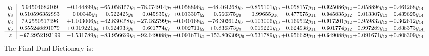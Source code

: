 \documentclass[11pt]{article}
\begin{document}
\[\begin{array}{c| c c@{\hskip 2pt} c@{\hskip 2pt} c@{\hskip 2pt} c@{\hskip 2pt} c@{\hskip 2pt} c@{\hskip 2pt} c@{\hskip 2pt} c@{\hskip 2pt} c@{\hskip 2pt} c@{\hskip 2pt} }
 y_{1}   &  5.94504682109 & -0.144899 y_{4} & + 65.058157 y_{6} & -78.074914 y_{7} & + 0.058896 y_{2} & + 48.464268 y_{9} & -0.855101 y_{10} & -0.058157 y_{11} & -0.925086 y_{12} & -0.058896 y_{13} & -0.464268 y_{14}\\
 y_{8}   &  0.510596352883 & -0.00345 y_{4} & -0.522425 y_{6} & + 0.045835 y_{7} & + 0.013307 y_{2} & -0.560375 y_{9} & -0.99655 y_{10} & -0.477575 y_{11} & -0.045835 y_{12} & -0.013307 y_{13} & -0.439625 y_{14}\\
 y_{3}   &  79.2550517496 & + 1.103006 y_{4} & -42.830458 y_{6} & -27.082799 y_{7} & -0.040168 y_{2} & + 76.302612 y_{9} & -0.103006 y_{10} & -0.169542 y_{11} & -0.917201 y_{12} & -0.959832 y_{13} & -0.302612 y_{14}\\
 y_{5}   &  0.655248891079 & + 0.019221 y_{4} & + 0.624938 y_{6} & + 0.601774 y_{7} & -0.002711 y_{2} & + 0.836373 y_{9} & -0.019221 y_{10} & -0.624938 y_{11} & -0.601774 y_{12} & -0.997289 y_{13} & -0.836373 y_{14}\\
\hline
z    &  -67.2952193199 & -1.531789 y_{4} & -83.956629 y_{6} & -92.649088 y_{7} & -0.091671 y_{2} & -153.806309 y_{9} & + 0.531789 y_{10} & + 0.956629 y_{11} & + 0.649088 y_{12} & + 0.091671 y_{13} & + 0.806309 y_{14}\\
\end{array}\]
The Final Dual Dictionary is: 
\end{document}
